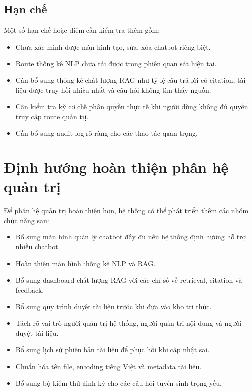 \subsection{Hạn chế}

Một số hạn chế hoặc điểm cần kiểm tra thêm gồm:

\begin{itemize}
    \item Chưa xác minh được màn hình tạo, sửa, xóa chatbot riêng biệt.
    \item Route thống kê NLP chưa tải được trong phiên quan sát hiện tại.
    \item Cần bổ sung thống kê chất lượng RAG như tỷ lệ câu trả lời có citation, tài liệu được truy hồi nhiều nhất và câu hỏi không tìm thấy nguồn.
    \item Cần kiểm tra kỹ cơ chế phân quyền thực tế khi người dùng không đủ quyền truy cập route quản trị.
    \item Cần bổ sung audit log rõ ràng cho các thao tác quan trọng.
\end{itemize}

\section{Định hướng hoàn thiện phân hệ quản trị}

Để phân hệ quản trị hoàn thiện hơn, hệ thống có thể phát triển thêm các nhóm chức năng sau:

\begin{itemize}
    \item Bổ sung màn hình quản lý chatbot đầy đủ nếu hệ thống định hướng hỗ trợ nhiều chatbot.
    \item Hoàn thiện màn hình thống kê NLP và RAG.
    \item Bổ sung dashboard chất lượng RAG với các chỉ số về retrieval, citation và feedback.
    \item Bổ sung quy trình duyệt tài liệu trước khi đưa vào kho tri thức.
    \item Tách rõ vai trò người quản trị hệ thống, người quản trị nội dung và người duyệt tài liệu.
    \item Bổ sung lịch sử phiên bản tài liệu để phục hồi khi cập nhật sai.
    \item Chuẩn hóa tên file, encoding tiếng Việt và metadata tài liệu.
    \item Bổ sung bộ kiểm thử định kỳ cho các câu hỏi tuyển sinh trọng yếu.
\end{itemize}

